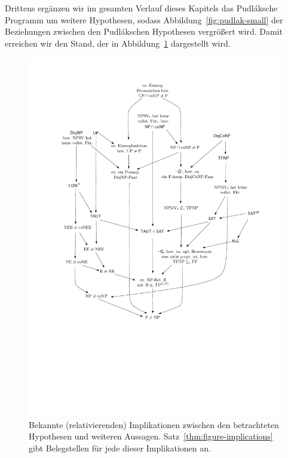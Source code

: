 
Drittens ergänzen wir im gesamten Verlauf dieses Kapitels das Pudláksche Programm um weitere Hypothesen, sodass Abbildung~\ref{fig:pudlak-small} der Beziehungen zwischen den Pudlákschen Hypothesen vergrößert wird. Damit erreichen wir den Stand, der in Abbildung~\ref{fig:figure-implications} dargestellt wird.


\begin{figure}
    \includegraphics[page=1]{figures.pdf}
    \caption{Bekannte (relativierenden) Implikationen zwischen den betrachteten Hypothesen und weiteren Aussagen. Satz~\ref{thm:figure-implications} gibt Belegstellen für jede dieser Implikationen an.}\label{fig:figure-implications}
    \forcerectofloat
\end{figure}

